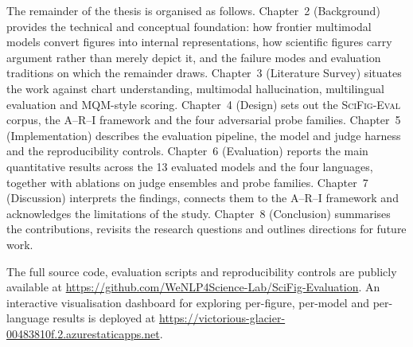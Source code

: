 The remainder of the thesis is organised as follows.
Chapter~2 (Background) provides the technical and conceptual
foundation: how frontier multimodal models convert figures into
internal representations, how scientific figures carry argument
rather than merely depict it, and the failure modes and evaluation
traditions on which the remainder draws.
Chapter~3 (Literature Survey) situates the work against chart
understanding, multimodal hallucination, multilingual evaluation
and MQM-style scoring.
Chapter~4 (Design) sets out the \textsc{SciFig-Eval} corpus, the A--R--I
framework and the four adversarial probe families.
Chapter~5 (Implementation) describes the evaluation pipeline, the
model and judge harness and the reproducibility controls.
Chapter~6 (Evaluation) reports the main quantitative results
across the 13 evaluated models and the four languages, together
with ablations on judge ensembles and probe families.
Chapter~7 (Discussion) interprets the findings, connects them to
the A--R--I framework and acknowledges the limitations of the
study.
Chapter~8 (Conclusion) summarises the contributions, revisits the
research questions and outlines directions for future work.

The full source code, evaluation scripts and reproducibility controls are publicly available at \url{https://github.com/WeNLP4Science-Lab/SciFig-Evaluation}.
An interactive visualisation dashboard for exploring per-figure, per-model and per-language results is deployed at \url{https://victorious-glacier-00483810f.2.azurestaticapps.net}.
